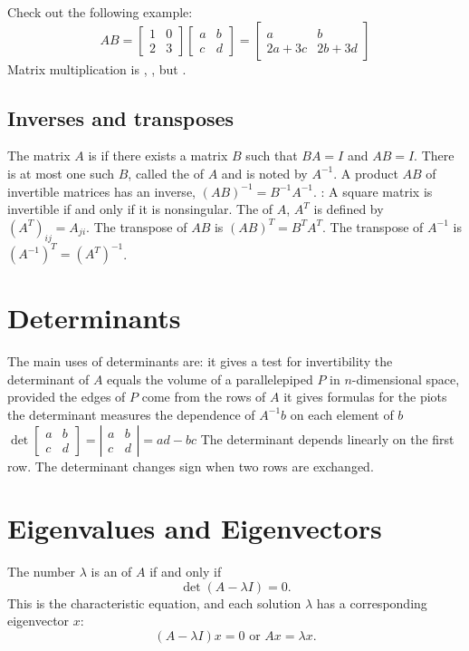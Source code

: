\documentclass{myproc}
\def\sbf{\sf\bfseries}
\begin{document}
\w Check out the following example:
  \[ AB = \left[\begin{array}{rr}1 & 0\\ 2 & 3\end{array}\right]
\left[\begin{array}{rr}a & b \\c & d\end{array}\right] =
\left[\begin{array}{rr}a & b \\ 2a+3c & 2b+3d\end{array}\right]\]
\w Matrix multiplication is , , but . 
\eit
\subsection{Inverses and transposes}
\bit
\w The matrix $A$ is  if there exists a matrix $B$ such that
$BA = I$ and $AB = I$. There is at most one such $B$, called the 
of $A$ and is noted by $A^{-1}$.
\w A product $AB$ of invertible matrices has an inverse, $(AB)^{-1} =
B^{-1}A^{-1}$.
\w {\sbf Theorem}: 
  A square matrix is invertible if and only if it is nonsingular.
\w The  of $A$, $A^T$ is defined by $(A^T)_{ij} = A_{ji}$.
\w The transpose of $AB$ is $(AB)^T = B^TA^T$.
\w The transpose of $A^{-1}$ is $(A^{-1})^T = (A^T)^{-1}$.
\eit


\section{Determinants}
\bit
\w The main uses of determinants are:
  \ben
  \w [(a)] it gives a test for invertibility
  \w [(b)] the determinant of $A$ equals the volume of a parallelepiped $P$ in
  $n$-dimensional space, provided the edges of $P$ come from the rows of $A$ 
  \w [(c)] it gives formulas for the piots
  \w [(d)] the determinant measures the dependence of $A^{-1}b$ on each
  element of $b$
  \een
\w $\det\left[\begin{array}{rr}a & b\\ c&d\end{array}\right]
  = \left|\begin{array}{rr} a&b\\c&d\end{array}\right| = ad - bc$
\w {}
 \ben
 \w [(a)] The determinant depends linearly on the first row.
 \w [(b)] The determinant changes sign when two rows are exchanged.
 \een
\eit

\section{Eigenvalues and Eigenvectors}
\bit
\w The number $\lambda$ is an  of $A$ if and only if
 \[ \det(A - \lambda{}I) = 0.\]
  This is the characteristic equation, and each solution $\lambda$ has a
  corresponding eigenvector $x$:
 \[ (A - \lambda I)x = 0 \mbox{\ \ or\ \ } Ax = \lambda x.\]
\eit




\nocite{Strang88}
\end{document}
